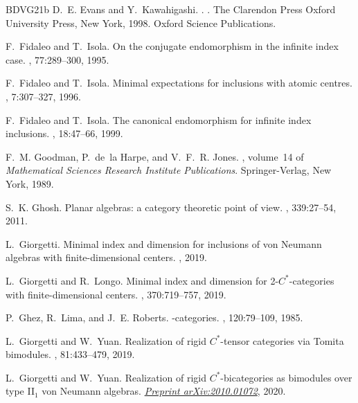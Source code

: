 \documentclass[11pt,a4paper]{article}
\theoremstyle{plain}
\theoremstyle{definition}
\theoremstyle{remark}
\numberwithin{equation}{section}%
\begin{document}
\begin{thebibliography}{BDVG21b}
D.~E. Evans and Y.~Kawahigashi.
.
. The Clarendon Press Oxford
  University Press, New York, 1998.
\newblock Oxford Science Publications.

F.~Fidaleo and T.~Isola.
\newblock On the conjugate endomorphism in the infinite index case.
, 77:289--300, 1995.

F.~Fidaleo and T.~Isola.
\newblock Minimal expectations for inclusions with atomic centres.
, 7:307--327, 1996.

F.~Fidaleo and T.~Isola.
\newblock The canonical endomorphism for infinite index inclusions.
, 18:47--66, 1999.

F.~M. Goodman, P.~de~la Harpe, and V.~F.~R. Jones.
, volume~14 of {\em
  {Mathematical Sciences Research Institute Publications}}.
\newblock Springer-Verlag, New York, 1989.

S.~K. Ghosh.
\newblock Planar algebras: a category theoretic point of view.
, 339:27--54, 2011.

L.~Giorgetti.
\newblock Minimal index and dimension for inclusions of von {N}eumann algebras
  with finite-dimensional centers.
, 2019.

L.~Giorgetti and R.~Longo.
\newblock Minimal index and dimension for 2-{$C^*$}-categories with
  finite-dimensional centers.
, 370:719--757, 2019.

P.~Ghez, R.~Lima, and J.~E. Roberts.
-categories.
, 120:79--109, 1985.

L.~Giorgetti and W.~Yuan.
\newblock Realization of rigid {$C^\ast$}-tensor categories via {T}omita
  bimodules.
, 81:433--479, 2019.

L.~Giorgetti and W.~Yuan.
\newblock Realization of rigid {$C^*$}-bicategories as bimodules over type
  {II}$_1$ von {N}eumann algebras.
\newblock \href{https://arxiv.org/abs/2010.01072}{\em Preprint arXiv:2010.01072}, 2020.


\end{thebibliography}
\end{document}
